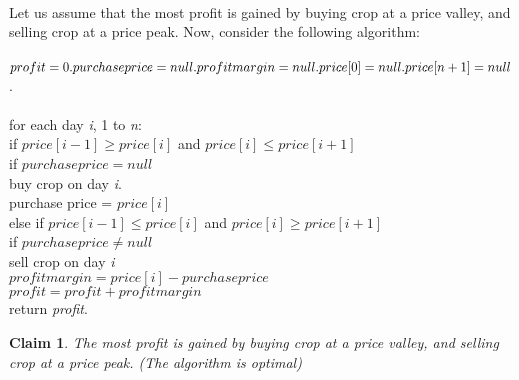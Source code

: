 \documentclass[11pt]{article}
\newtheorem{claim}[theorem]{Claim}
\begin{document}
		\\
		Let us assume that the most profit is gained by buying crop at a price valley, and selling crop at a price peak. Now, consider the following algorithm:\\
		\\
		$profit = 0.\\
		purchase price = null.\\
		profit margin = null.
		price[0] = null.\\
		price[n+1] = null$.\\
		\\
		for each day \textit{i}, 1 to \textit{n}:\\
		\indent  if $price[i-1] \geq price[i]$ and $price[i] \leq price[i+1]$\\
		\indent \indent if $purchase price = null$\\
		\indent \indent \indent buy crop on day \textit{i}.\\
		\indent \indent \indent purchase price = $price[i]$\\
		\indent else if $price[i-1] \leq price[i]$ and $price[i] \geq price[i+1]$\\
		\indent \indent if $purchase price \neq null$ \\
		\indent \indent \indent sell crop on day \textit{i} \\
		\indent \indent \indent $profit margin = price[i] - purchase price$ \\
		\indent \indent \indent $profit = profit + profit margin$ \\
		return \textit{profit}.
		

	\begin{claim} 
		The most profit is gained by buying crop at a price valley, and selling crop at a price peak. (The algorithm is optimal)
	\end{claim}
\end{document}
